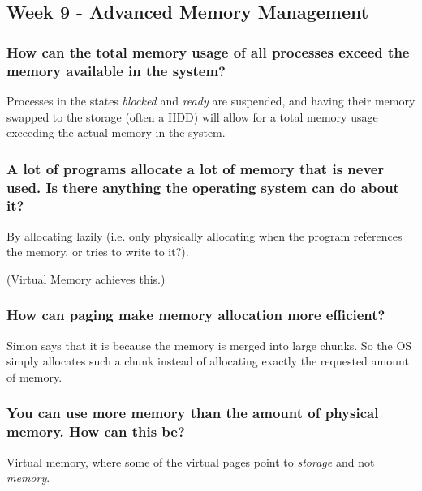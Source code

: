 \subsection*{Week 9 - Advanced Memory Management}
\subsubsection*{How can the total memory usage of all processes exceed the memory available in the system?}
Processes in the states \emph{blocked} and \emph{ready} are suspended, and having their memory swapped to the storage (often a HDD) will allow for a total memory usage exceeding the actual memory in the system.



\subsubsection*{A lot of programs allocate a lot of memory that is never used. Is there anything the operating system can do about it?}
By allocating lazily (i.e. only physically allocating when the program references the memory, or tries to write to it?).

(Virtual Memory achieves this.)


\subsubsection*{How can paging make memory allocation more efficient?}
Simon says that it is because the memory is merged into large chunks. So the OS simply allocates such a chunk instead of allocating exactly the requested amount of memory.


\subsubsection*{You can use more memory than the amount of physical memory. How can this be?}
Virtual memory, where some of the virtual pages point to \emph{storage} and not \emph{memory}.